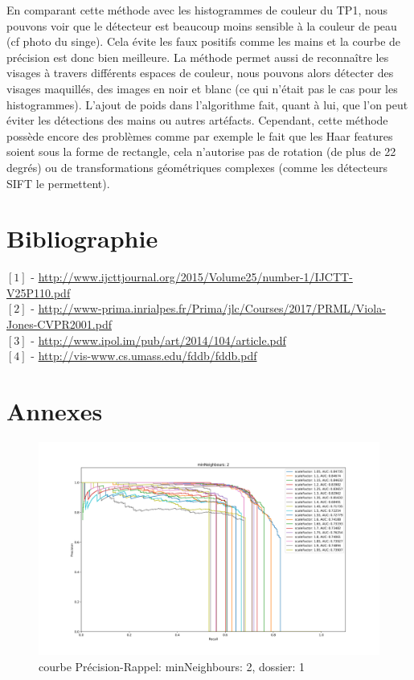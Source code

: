 \documentclass[a4paper,11pt]{article}
\begin{document}
    En comparant cette méthode avec les histogrammes de couleur du TP1, nous pouvons voir que le
    détecteur est beaucoup moins sensible à la couleur de peau (cf photo du singe). Cela évite les
    faux positifs comme les mains et la courbe de précision est donc bien meilleure. La méthode
    permet aussi de reconnaître les visages à travers différents espaces de couleur, nous pouvons
    alors détecter des visages maquillés, des images en noir et blanc (ce qui n'était pas le cas
    pour les histogrammes). L'ajout de poids dans l'algorithme fait, quant à lui, que l'on peut
    éviter les détections des mains ou autres artéfacts.
    Cependant, cette méthode possède encore des problèmes comme par exemple le fait que les Haar
    features soient sous la forme de rectangle, cela n'autorise pas de rotation (de plus de 22
    degrés)  ou de transformations géométriques complexes (comme les détecteurs SIFT le permettent). 

\section{Bibliographie}
\flushleft
$[1]$ - \url{http://www.ijcttjournal.org/2015/Volume25/number-1/IJCTT-V25P110.pdf} \\
$[2]$ - \url{http://www-prima.inrialpes.fr/Prima/jlc/Courses/2017/PRML/Viola-Jones-CVPR2001.pdf} \\
$[3]$ - \url{http://www.ipol.im/pub/art/2014/104/article.pdf} \\
$[4]$ - \url{http://vis-www.cs.umass.edu/fddb/fddb.pdf}

\section{Annexes}
    

	\begin{figure}[H]
	    \begin{center}
		\includegraphics[scale = 0.4]{images/courbes/folder_01_minN_2.png}
		\caption{courbe Précision-Rappel: minNeighbours: 2, dossier: 1}
		\label{fig:minN_2}
	    \end{center}
	\end{figure}
\end{document}
